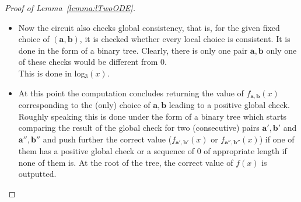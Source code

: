 \documentclass[11pt, oneside]{article}
\newenvironment{toappendix}{}{}
\newcommand{\longv}[1]{}
\newcommand{\tu}[1]{\mathbf{#1}}
\theoremstyle{definition}
\begin{document}
\begin{toappendix}
\begin{proof}[Proof of Lemma~\ref{lemma:lTwoODE}]
\begin{itemize}
        This is done in constant depth.
        \item Now the circuit also checks global consistency,
        that is, for the given fixed choice of $(\tu a, \tu b)$, it is checked whether every local choice is consistent.
        It is done in the form of a binary tree. Clearly, there is only one pair $\tu a, \tu b$ only one of these checks would be different from 0.
        \\
        This is done in log$_3(x)$.
        \item At this point the computation concludes returning the value of $f_{\tu a, \tu b}(x)$ corresponding to the (only) choice of $\tu a, \tu b$ leading to a positive global check. Roughly speaking this is done under the form of a binary tree which starts  comparing the result of the global check for two (consecutive) pairs $\tu a', \tu b'$ and $\tu a'',\tu b''$ and push further the correct value ($f_{\tu a', \tu b'}(x)$ or $f_{\tu a'', \tu b''}(x)$) if one of them has a positive global check or  a sequence of $0$ of appropriate length if none of them is. At the root of the tree, the correct value of $f(x)$ is outputted. 
\end{itemize}
\longv{   

        \textcolor{red}{The rest of the proof is not useful in a short version}
        
}
\end{proof}
\end{toappendix}
\end{document}

